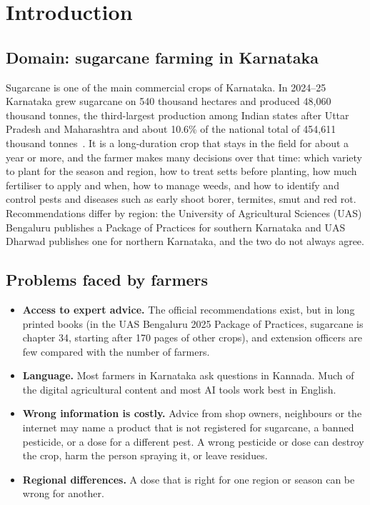 \chapter{Introduction}

\section{Domain: sugarcane farming in Karnataka}
Sugarcane is one of the main commercial crops of Karnataka. In 2024--25 Karnataka grew
sugarcane on 540 thousand hectares and produced 48,060 thousand tonnes, the third-largest
production among Indian states after Uttar Pradesh and Maharashtra and about 10.6\% of the
national total of 454,611 thousand tonnes~\cite{pib2025sugarcane}.
It is a long-duration crop that stays in the field for about a year or more, and the farmer
makes many decisions over that time: which variety to plant for the season and region,
how to treat setts before planting, how much fertiliser to apply and when, how to manage
weeds, and how to identify and control pests and diseases such as early shoot borer,
termites, smut and red rot. Recommendations differ by region: the University of
Agricultural Sciences (UAS) Bengaluru publishes a Package of Practices for southern
Karnataka and UAS Dharwad publishes one for northern Karnataka, and the two do not
always agree.

\section{Problems faced by farmers}
\begin{itemize}
  \item \textbf{Access to expert advice.} The official recommendations exist, but in long
    printed books (in the UAS Bengaluru 2025 Package of Practices, sugarcane is chapter 34,
    starting after 170 pages of other crops), and extension officers are few compared with the number of farmers.
  \item \textbf{Language.} Most farmers in Karnataka ask questions in Kannada. Much of the
    digital agricultural content and most AI tools work best in English.
  \item \textbf{Wrong information is costly.} Advice from shop owners, neighbours or the
    internet may name a product that is not registered for sugarcane, a banned
    pesticide, or a dose for a different pest. A wrong pesticide or dose can destroy the
    crop, harm the person spraying it, or leave residues.
  \item \textbf{Regional differences.} A dose that is right for one region or season can be
    wrong for another.
\end{itemize}

